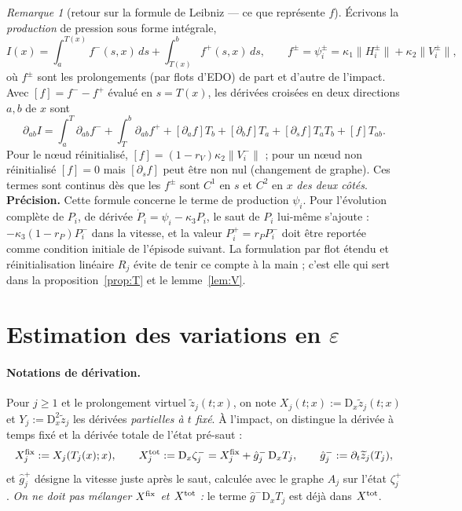 \documentclass[11pt,a4paper]{article}
\theoremstyle{remark}
\newtheorem{remarque}[theoreme]{Remarque}
\theoremstyle{definition}
\newcommand{\norm}[1]{\lVert #1\rVert}
\newcommand{\eps}{\varepsilon}
\newcommand{\zt}{\widetilde z}
\newcommand{\D}{\mathrm D}
\begin{document}
\begin{remarque}[retour sur la formule de Leibniz --- ce que représente $f$]\label{rem:leibniz}
Écrivons la \emph{production} de pression sous forme intégrale,
\[
I(x)=\int_a^{T(x)}f^-(s,x)\,ds+\int_{T(x)}^bf^+(s,x)\,ds,\qquad f^\pm=\psi_i^\pm=\kappa_1\norm{H_i^\pm}+\kappa_2\norm{V_i^\pm},
\]
où $f^\pm$ sont les prolongements (par flots d'EDO) de part et d'autre de l'impact. Avec $[f]=f^--f^+$ évalué en $s=T(x)$, les dérivées croisées en deux directions $a,b$ de $x$ sont
\[
\partial_{ab}I=\int_a^T\partial_{ab}f^-+\int_T^b\partial_{ab}f^+ +[\partial_af]T_b+[\partial_bf]T_a+[\partial_sf]T_aT_b+[f]T_{ab}.
\]
Pour le n\oe ud réinitialisé, $[f]=(1-r_V)\kappa_2\norm{V_i^-}$ ; pour un n\oe ud non réinitialisé $[f]=0$ mais $[\partial_sf]$ peut être non nul (changement de graphe). Ces termes sont continus dès que les $f^\pm$ sont $C^1$ en $s$ et $C^2$ en $x$ \emph{des deux côtés}. \textbf{Précision.} Cette formule concerne le terme de production $\psi_i$. Pour l'évolution complète de $P_i$, de dérivée $\dot P_i=\psi_i-\kappa_3P_i$, le saut de $P_i$ lui-même s'ajoute : $-\kappa_3(1-r_P)P_i^-$ dans la vitesse, et la valeur $P_i^+=r_PP_i^-$ doit être reportée comme condition initiale de l'épisode suivant. La formulation par flot étendu et réinitialisation linéaire $R_j$ évite de tenir ce compte à la main ; c'est elle qui sert dans la proposition~\ref{prop:T} et le lemme~\ref{lem:V}.
\end{remarque}

\section{Estimation des variations en $\eps$}

\paragraph{Notations de dérivation.} Pour $j\ge1$ et le prolongement virtuel $\zt_j(t;x)$, on note $X_j(t;x):=\D_x\zt_j(t;x)$ et $Y_j:=\D_x^2\zt_j$ les dérivées \emph{partielles à $t$ fixé}. À l'impact, on distingue la dérivée à temps fixé et la dérivée totale de l'état pré-saut :
\[
X^{\rm fix}_j:=X_j(T_j(x);x),\qquad
X^{\rm tot}_j:=\D_x\zeta^-_j=X^{\rm fix}_j+\hat g^-_j\,\D_xT_j,\qquad \hat g^-_j:=\partial_t\zt_j(T_j),
\]
et $\hat g^+_j$ désigne la vitesse juste après le saut, calculée avec le graphe $A_j$ sur l'état $\zeta^+_j$. \emph{On ne doit pas mélanger $X^{\rm fix}$ et $X^{\rm tot}$ :} le terme $\hat g^-\D_xT_j$ est déjà dans $X^{\rm tot}$.
\end{document}
